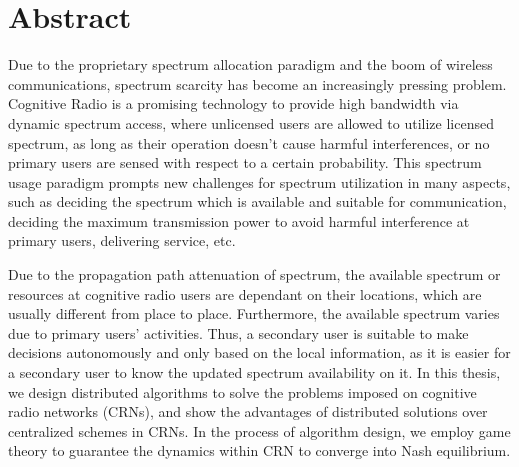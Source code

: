 \chapter{Abstract}
Due to the proprietary spectrum allocation paradigm and the boom of wireless communications, spectrum scarcity has become an increasingly pressing problem. 
Cognitive Radio is a promising technology to provide high bandwidth via dynamic spectrum access, where unlicensed users  are allowed to utilize licensed spectrum, as long as their operation doesn't cause harmful interferences, or no primary users are sensed with respect to a certain probability.
This spectrum usage paradigm prompts new challenges for spectrum utilization in many aspects, such as deciding the spectrum which is available and suitable for communication, deciding the maximum transmission power to avoid harmful interference at primary users, delivering service, etc.


Due to the propagation path attenuation of spectrum, the available spectrum or resources at cognitive radio users are dependant on their locations, which are usually different from place to place.
Furthermore, the available spectrum varies due to primary users' activities.
Thus, a secondary user is suitable to make decisions autonomously and only based on the local information, as it is easier for a secondary user to know the updated spectrum availability on it.
In this thesis, we design distributed algorithms to solve the problems imposed on cognitive radio networks (CRNs), and show the advantages of distributed solutions over centralized schemes in CRNs.
In the process of algorithm design, we employ game theory to guarantee the dynamics within CRN to converge into Nash equilibrium.

